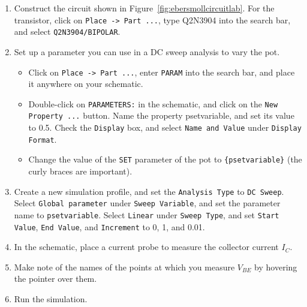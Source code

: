 \documentclass[11pt]{article}
\begin{document}
\begin{enumerate}
\item Construct the circuit shown in
  Figure~\ref{fig:ebersmollcircuitlab}. For the transistor, click on
  \texttt{Place -> Part ...}, type Q2N3904 into the search bar, and
  select \texttt{Q2N3904/BIPOLAR}.

\item Set up a parameter you can use in a DC sweep analysis to vary
  the pot.
  \begin{itemize}
    \item Click on \texttt{Place -> Part ...}, enter \texttt{PARAM} into
      the search bar, and place it anywhere on your schematic.

    \item Double-click on \texttt{PARAMETERS:} in the schematic, and
      click on the \texttt{New Property ...} button. Name the property
      psetvariable, and set its value to 0.5. Check the
      \texttt{Display} box, and select \texttt{Name and Value} under
      \texttt{Display Format}.
    \item Change the value of the \texttt{SET} parameter of the pot to
      \verb+{psetvariable}+ (the curly braces are important).
  \end{itemize}

\item Create a new simulation profile, and set the \texttt{Analysis
  Type} to \texttt{DC Sweep}. Select \texttt{Global parameter} under
  \texttt{Sweep Variable}, and set the parameter name to
  \texttt{psetvariable}. Select \texttt{Linear} under \texttt{Sweep
    Type}, and set \texttt{Start Value}, \texttt{End Value}, and
  \texttt{Increment} to 0, 1, and 0.01.

\item In the schematic, place a current probe to measure the collector
  current $I_C$.

\item Make note of the names of the points at which you measure
  $V_{BE}$ by hovering the pointer over them.

\item Run the simulation.


\end{enumerate}
\end{document}
